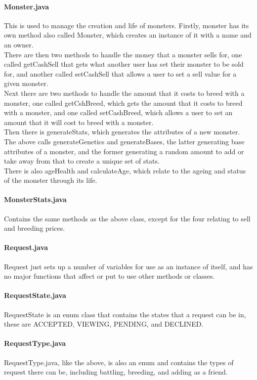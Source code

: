 \documentclass{project}
\begin{document}
\paragraph{Monster.java}
This is used to manage the creation and life of monsters.
Firstly, monster has its own method also called Monster, which creates an instance of it with a name and an owner.\\
There are then two methods to handle the money that a monster sells for, one called getCashSell that gets what another user has set their monster to be sold for, and another called setCashSell that allows a user to set a sell value for a given monster.\\
Next there are two methods to handle the amount that it costs to breed with a monster, one called getCshBreed, which gets the amount that it costs to breed with a monster, and one called setCashBreed, which allows a user to set an amount that it will cost to breed with a monster.\\
Then there is generateStats, which generates the attributes of a new monster.\\
The above calls generateGenetics and generateBases, the latter generating base attributes of a monster, and the former generating a random amount to add or take away from that to create a unique set of stats.\\
There is also ageHealth and calculateAge, which relate to the ageing and status of the monster through its life.\\
\paragraph{MonsterStats.java}
Contains the same methods as the above class, except for the four relating to sell and breeding prices.
\paragraph{Request.java}
Request just sets up a number of variables for use as an instance of itself, and has no major functions that affect or put to use other methods or classes.
\paragraph{RequestState.java}
RequestState is an enum class that contains the states that a request can be in, these are ACCEPTED, VIEWING, PENDING, and DECLINED.
\paragraph{RequestType.java}
RequestType.java, like the above, is also an enum and contains the types of request there can be, including battling, breeding, and adding as a friend.
\end{document}
